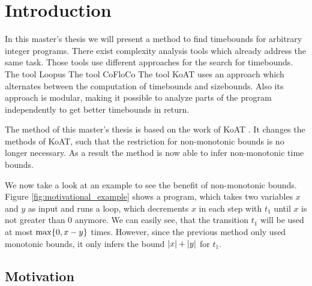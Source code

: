 \section{Introduction}

In this master's thesis we will present a method to find timebounds for arbitrary integer programs.
There exist complexity analysis tools which already address the same task.
Those tools use different approaches for the search for timebounds.
The tool Loopus \cite{loopus1} \cite{loopus2} 
The tool CoFloCo \cite{cofloco1} \cite{cofloco2} \cite{cofloco3} \cite{cofloco4} 
The tool KoAT \cite{koat} uses an approach which alternates between the computation of timebounds and sizebounds.
Also its approach is modular, making it possible to analyze parts of the program independently to get better timebounds in return.

The method of this master's thesis is based on the work of KoAT \cite{koat}.
It changes the methods of KoAT, such that the restriction for non-monotonic bounds is no longer necessary.
As a result the method is now able to infer non-monotonic time bounds.

We now take a look at an example to see the benefit of non-monotonic bounds.
Figure \ref{fig:motivational_example} shows a program, which takes two variables $x$ and $y$ as input and runs a loop, which decrements $x$ in each step with $t_1$ until $x$ is not greater than 0 anymore.
We can easily see, that the transition $t_1$ will be used at most $\max \lbrace 0, x-y \rbrace$ times.
However, since the previous method only used monotonic bounds, it only infers the bound $\left|x\right|+\left|y\right|$ for $t_1$.


\subsection{Motivation}





